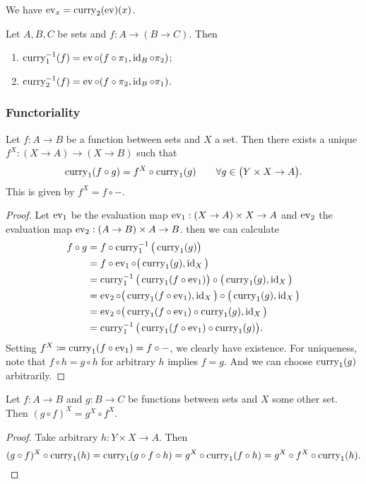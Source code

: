 We have $\operatorname{ev}_x = \operatorname{curry}_2(\operatorname{ev})(x)$.

\begin{lemma} \label{inverseCurryLemma}
Let $A,B,C$ be sets and $f: A\to (B\to C)$. Then
\begin{enumerate}
\item $\operatorname{curry}_1^{-1}(f) = \operatorname{ev}\circ (f\circ \pi_1, \operatorname{id}_B\circ \pi_2)$;
\item $\operatorname{curry}_2^{-1}(f) = \operatorname{ev}\circ (f\circ\pi_2, \operatorname{id}_B\circ\pi_1)$.
\end{enumerate}
\end{lemma}

\subsubsection{Functoriality}
\begin{proposition}
Let $f: A\to B$ be a function between sets and $X$ a set. Then there exists a unique $f^X: (X\to A)\to (X\to B)$ such that
\[ \operatorname{curry}_1(f\circ g) = f^X\circ \operatorname{curry}_1(g) \qquad \forall g\in \big(Y\times X \to A\big). \]
This is given by $f^X = f\circ -$.
\end{proposition}
\begin{proof}
Let $\operatorname{ev}_1$ be the evaluation map $\operatorname{ev}_1: (X\to A)\times X \to A$ and $\operatorname{ev}_2$ the evaluation map $\operatorname{ev}_2: (A\to B) \times A \to B$.
then we can calculate
\begin{align*}
f \circ g &= f \circ \operatorname{curry}_1^{-1}\big(\operatorname{curry}_1(g)\big) \\
&= f \circ \operatorname{ev}_1 \circ \big(\operatorname{curry}_1(g), \operatorname{id}_X\big) \\
&= \operatorname{curry}_1^{-1}\big(\operatorname{curry}_1(f \circ \operatorname{ev}_1)\big) \circ \big(\operatorname{curry}_1(g), \operatorname{id}_X\big) \\
&= \operatorname{ev}_2\circ \big(\operatorname{curry}_1(f \circ \operatorname{ev}_1), \operatorname{id}_X\big) \circ \big(\operatorname{curry}_1(g), \operatorname{id}_X\big) \\
&= \operatorname{ev}_2\circ \big(\operatorname{curry}_1(f \circ \operatorname{ev}_1) \circ \operatorname{curry}_1(g), \operatorname{id}_X\big) \\
&= \operatorname{curry}_1^{-1}\big(\operatorname{curry}_1(f \circ \operatorname{ev}_1) \circ \operatorname{curry}_1(g)\big).
\end{align*}
Setting $f^X \coloneqq \operatorname{curry}_1(f \circ \operatorname{ev}_1) = f\circ -$, we clearly have existence. For uniqueness, note that $f\circ h = g \circ h$ for arbitrary $h$ implies $f=g$. And we can choose $\operatorname{curry}_1(g)$ arbitrarily.
\end{proof}
\begin{corollary}
Let $f: A\to B$ and $g: B\to C$ be functions between sets and $X$ some other set. Then $(g\circ f)^X = g^X\circ f^X$.
\end{corollary}
\begin{proof}
Take arbitrary $h: Y\times X \to A$. Then
\[ (g\circ f)^X\circ \operatorname{curry}_1(h) = \operatorname{curry}_1(g\circ f\circ h) = g^X\circ \operatorname{curry}_1(f\circ h) = g^X \circ f^X \circ \operatorname{curry}_1(h). \]
\end{proof}

